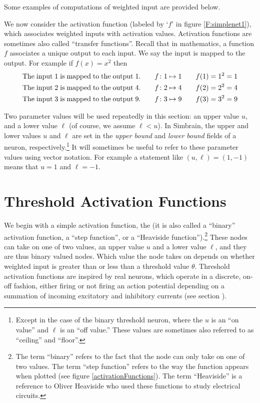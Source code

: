 Some examples of computations of weighted input are provided below.

We now consider the activation function (labeled by `$f$' in figure
\ref{F:simplenet1}), which associates weighted inputs with activation 
values. Activation functions are sometimes also called ``transfer functions''. Recall 
that in mathematics, a function $f$ associates a unique output to each input. 
We say the input is mapped to the output. For example if $f(x) = x^2$ 
then  
\begin{eqnarray*}
{\rm The\; input\; 1\; is\; mapped\; to\; the\; output\; 1}.
\qquad f\colon 1 \mapsto 1 
\qquad f(1)=1^2 = 1 \\ 
{\rm The\; input\; 2\; is\; mapped\; to\; the\; output\; 4}.
\qquad f\colon 2 \mapsto 4
\qquad f(2)=2^2 = 4 \\
{\rm The\; input\; 3\; is\; mapped\; to\; the\; output\; 9}.
\qquad f\colon 3 \mapsto 9
\qquad f(3)=3^2 = 9 
\end{eqnarray*}

   Two parameter values will be used repeatedly in this section: an upper value 
$u$, and a lower value $\ell$ (of course, we assume $\ell < u$). In Simbrain, the upper and lower values $u$ and 
$\ell$ are set in the \emph{upper bound} and \emph{lower bound} fields of a neuron, respectively.\footnote{Except in the case of the binary threshold neuron, where the $u$ is an ``on value'' and $\ell$ is an ``off value.''  These values are sometimes also referred to as ``ceiling'' and ``floor''.}  It will sometimes be useful to refer to these parameter values using vector notation. For example a statement like $(u,\ell) = (1,-1)$ means that $u = 1$ and $\ell = -1$. 

\section{Threshold Activation Functions}

   We begin with a simple activation function, the  (it is also called a ``binary'' activation function, a ``step function'', or a 
``Heaviside function'').\footnote{The term ``binary'' refers to the fact that the
node can only take on one of two values. The term ``step function'' refers to the way the function appears when plotted (see figure \ref{activationFunctions}). The term ``Heaviside'' is a reference to Oliver Heaviside  who used these functions to study electrical circuits.}  These nodes can take on one of two values, an upper 
value $u$ and a lower value $\ell$, and they are thus binary valued nodes. 
Which value the node takes on depends on whether weighted input is greater than 
or less than a threshold value $\theta$. Threshold 
activation functions are inspired by real neurons, which operate in a 
discrete, on-off fashion, either firing or not firing an action potential
depending on a summation of incoming excitatory and inhibitory currents (see section ).

